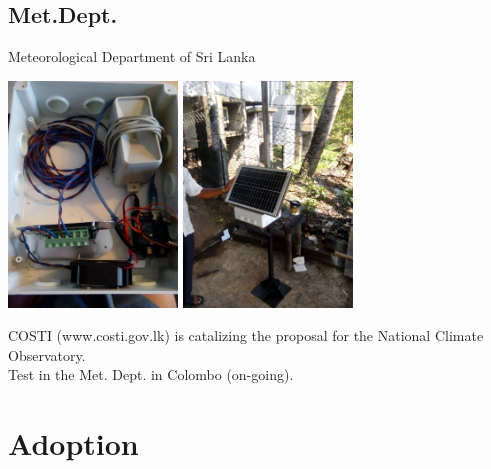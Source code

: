 \documentclass[xcolor=dvipsnames,beamer,unknownkeysallowed]{beamer} %
\begin{document}
\subsection{Met.Dept.}
\begin{frame}[fragile]{Meteorological Department of Sri Lanka}
\begin{center}
 \includegraphics[width=4.5cm]{LKmetdept}
 \hspace{5mm}
 \includegraphics[width=4.5cm]{LKmetdept1}
\end{center}

COSTI (www.costi.gov.lk) is catalizing the proposal for the National Climate Observatory.\\
Test in the Met. Dept. in Colombo (on-going).

\end{frame}

\section{Adoption}
\end{document}
